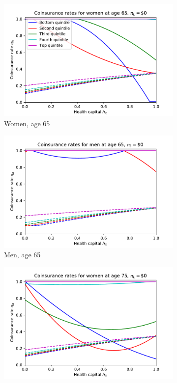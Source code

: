 \documentclass[12pt,pdftex,letterpaper]{article}
\begin{document}
\begin{figure}[h!]
    \centering
    \begin{subfigure}[b]{0.49\textwidth}
        \centering
        \includegraphics[width=\textwidth]{../Figures/SocOpt00CopayWomen65.pdf}
        \caption{Women, age 65}
    \end{subfigure}
    \begin{subfigure}[b]{0.49\textwidth}
        \centering
        \includegraphics[width=\textwidth]{../Figures/SocOpt00CopayMen65.pdf}
        \caption{Men, age 65}
    \end{subfigure}
    \begin{subfigure}[b]{0.49\textwidth}
        \centering
        \includegraphics[width=\textwidth]{../Figures/SocOpt00CopayWomen75.pdf}

\end{subfigure}
\end{figure}
\end{document}
